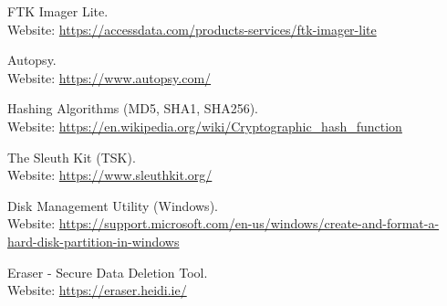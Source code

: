 \documentclass[11pt]{article}
\begin{document}
\clearpage
\begin{thebibliography}{99}
    FTK Imager Lite. \\
    Website: \url{https://accessdata.com/products-services/ftk-imager-lite}

    Autopsy. \\
    Website: \url{https://www.autopsy.com/}

    Hashing Algorithms (MD5, SHA1, SHA256). \\
    Website: \url{https://en.wikipedia.org/wiki/Cryptographic_hash_function}

    The Sleuth Kit (TSK). \\
    Website: \url{https://www.sleuthkit.org/}

    Disk Management Utility (Windows). \\
    Website: \url{https://support.microsoft.com/en-us/windows/create-and-format-a-hard-disk-partition-in-windows}

    Eraser - Secure Data Deletion Tool. \\
    Website: \url{https://eraser.heidi.ie/}
\end{thebibliography}
\end{document}
